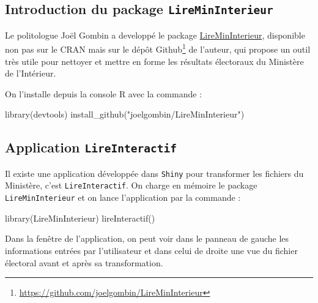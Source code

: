 \documentclass[
]{article}
\newenvironment{Shaded}{\begin{snugshade}}{\end{snugshade}}
\newcommand{\FunctionTok}[1]{\textcolor[rgb]{0.00,0.00,0.00}{#1}}
\newcommand{\NormalTok}[1]{#1}
\newcommand{\StringTok}[1]{\textcolor[rgb]{0.31,0.60,0.02}{#1}}
\begin{document}
\hypertarget{introduction-du-package-liremininterieur}{%
\subsection{\texorpdfstring{Introduction du package
\texttt{LireMinInterieur}}{Introduction du package LireMinInterieur}}\label{introduction-du-package-liremininterieur}}

Le politologue Joël Gombin a developpé le package
\href{https://github.com/joelgombin/LireMinInterieur}{LireMinInterieur},
disponible non pas sur le CRAN mais sur le dépôt Github\footnote{\url{https://github.com/joelgombin/LireMinInterieur}}
de l'auteur, qui propose un outil très utile pour nettoyer et mettre en
forme les résultats électoraux du Ministère de l'Intérieur.

On l'installe depuis la console R avec la commande :

\begin{Shaded}
\begin{Highlighting}[]
\FunctionTok{library}\NormalTok{(devtools)}
\FunctionTok{install\_github}\NormalTok{(}\StringTok{"joelgombin/LireMinInterieur"}\NormalTok{)}
\end{Highlighting}
\end{Shaded}

\hypertarget{application-lireinteractif}{%
\subsection{\texorpdfstring{Application
\texttt{LireInteractif}}{Application LireInteractif}}\label{application-lireinteractif}}

Il existe une application développée dans \texttt{Shiny} pour
transformer les fichiers du Ministère, c'est \texttt{LireInteractif}. On
charge en mémoire le package \texttt{LireMinInterieur} et on lance
l'application par la commande :

\begin{Shaded}
\begin{Highlighting}[]
\FunctionTok{library}\NormalTok{(LireMinInterieur)}
\FunctionTok{lireInteractif}\NormalTok{()}
\end{Highlighting}
\end{Shaded}

Dans la fenêtre de l'application, on peut voir dans le panneau de gauche
les informations entrées par l'utilisateur et dans celui de droite une
vue du fichier électoral avant et après sa transformation.
\end{document}
